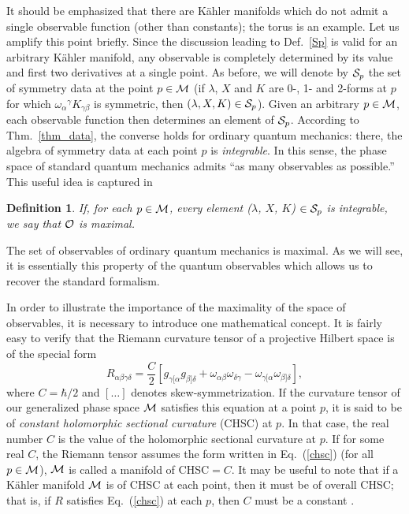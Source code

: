 \documentclass[12pt,aps,eqsecnum,tighten,nofootinbib]{revtex4-2}
\newtheorem{definition}{Definition}[section]
\def\be{\begin{equation}}
\def\ee{\end{equation}}
\def\a{\alpha}
\def\b{\beta}
\def\c{\gamma}
\def\M{{\cal M}}
\def\w{\omega}
\newcommand{\eqn}[1]{Eq.~(\ref{#1})}
\begin{document}
It should be emphasized that there are K\"ahler manifolds which do not
admit a single observable function (other than constants); the torus
is an example.  Let us amplify this point briefly.  Since the
discussion leading to Def.~\ref{Sp} is valid for an arbitrary K\"ahler
manifold, any observable is completely determined by its value and
first two derivatives at a single point.  As before, we will denote by
${\cal S}_p$ the set of symmetry data at the point $p \in \M $ (if
$\lambda$, $X$ and $K$ are 0-, 1- and 2-forms at $p$ for which
$\w_{\a}{}^{\c}K_{\c\b}$ is symmetric, then $(\lambda, X, K) \in {\cal
S}_p$).  Given an arbitrary $p\in\M$, each observable function then
determines an element of ${\cal S}_p$.  According to
Thm.~\ref{thm_data}, the converse holds for ordinary quantum
mechanics: there, the algebra of symmetry data at each point $p$ is
{\em integrable}.  In this sense, the phase space of standard quantum
mechanics admits ``as many observables as possible.''  This useful
idea is captured in
%
\begin{definition}
If, for each $p \in \M$, every element ($\lambda$, $X$, $K$)
$\in {\cal S}_p$ is integrable, we say that ${\cal O}$ is
{\em maximal}.
\end{definition}
%
\noindent
The set of observables of ordinary quantum mechanics is maximal.  As
we will see, it is essentially this property of the quantum
observables which allows us to recover the standard formalism.

In order to illustrate the importance of the maximality of the space
of observables, it is necessary to introduce one mathematical concept.
It is fairly easy to verify that the Riemann curvature tensor of a
projective Hilbert space is of the special form
%
\be \label{chsc}
R_{\a\b\c\delta} = \frac{C}{2} \left[
g_{\c[\a} g_{\b]\delta} + \w_{\a\b} \w_{\delta\c} -
\w_{\c[\a} \w_{\b]\delta}  \right],
\ee
%
where $C = \hbar / 2$ and $[\ldots]$ denotes skew-symmetrization.  If
the curvature tensor of our generalized 
phase space $\M$ satisfies this equation at a point $p$, it is said to
be of {\em constant holomorphic sectional curvature} (CHSC) at $p$.
In that case, the real number $C$ is the value of the holomorphic
sectional curvature at $p$.  If for some real $C$, the Riemann tensor
assumes the form written in \eqn{chsc} (for all $p\in\M$), $\M$ is
called a manifold of CHSC$=C$.  It may be useful to note that if a
K\"ahler manifold $\M$ is of CHSC at each point, then it must be of
overall CHSC; that is, if $R$ satisfies \eqn{chsc} at each $p$, then
$C$ must be a constant \cite{yano}.
\end{document}
